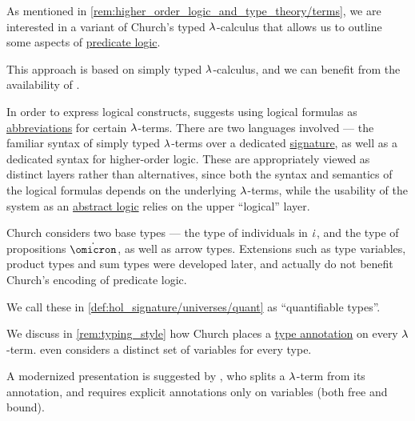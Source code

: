 \begin{remark}\label{rem:simply_typed_hol}
  As mentioned in \cref{rem:higher_order_logic_and_type_theory/terms}, we are interested in a variant of Church's typed \( {\mathrm \lambda} \)-calculus that allows us to outline some aspects of \hyperref[rem:predicate_logic]{predicate logic}.

  This approach is based on simply typed \( {\mathrm \lambda} \)-calculus, and we can benefit from the availability of .

  In order to express logical constructs,  suggests using logical formulas as \hyperref[con:syntactic_abbreviation]{abbreviations} for certain \( {\mathrm \lambda} \)-terms. There are two languages involved --- the familiar syntax of simply typed \( {\mathrm \lambda} \)-terms over a dedicated \hyperref[def:simple_type_signature]{signature}, as well as a dedicated syntax for higher-order logic. These are appropriately viewed as distinct layers rather than alternatives, since both the syntax and semantics of the logical formulas depends on the underlying \( {\mathrm \lambda} \)-terms, while the usability of the system as an \hyperref[def:abstract_logic]{abstract logic} relies on the upper \enquote{logical} layer.

  \begin{thmenum}
     Church considers two base types --- the type of individuals in \( \dot{\iota} \), and the type of propositions \( \syn\omicron \), as well as arrow types. Extensions such as type variables, product types and sum types were developed later, and actually do not benefit Church's encoding of predicate logic.

    We call these in \cref{def:hol_signature/universes/quant} as \enquote{quantifiable types}.

     We discuss in \cref{rem:typing_style} how Church places a \hyperref[con:type_annotation]{type annotation} on every \( {\mathrm \lambda} \)-term.  even considers a distinct set of variables for every type.

    A modernized presentation is suggested by , who splits a \( {\mathrm \lambda} \)-term from its annotation, and requires explicit annotations only on variables (both free and bound).


\end{thmenum}
\end{remark}
